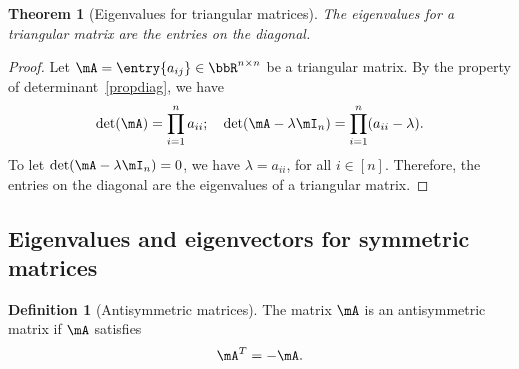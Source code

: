 \documentclass[11pt]{article}
\theoremstyle{plain}
\newtheorem{thm}{Theorem}[section]
\theoremstyle{definition}
\newtheorem{defn}{Definition}
\begin{document}
\begin{thm}[Eigenvalues for triangular matrices]\label{thm:trianeigen}
	The eigenvalues for a triangular matrix are the entries on the diagonal.
\end{thm}

\begin{proof}
Let $\mA = \entry{a_{ij}} \in \bbR^{n \times n}$ be a triangular matrix. By the property of determinant~\ref{propdiag}, we have
\[ \det(\mA) = \prod_{i=1}^n a_{ii}  ; \quad \det(\mA - \lambda \mI_n) = \prod_{i=1}^n (a_{ii}-\lambda). \]
To let $\det(\mA - \lambda \mI_n) = 0$, we have $\lambda = a_{ii}$, for all $ i\in[n]$. Therefore, the entries on the diagonal are the eigenvalues of a triangular matrix.
\end{proof}


\subsection{Eigenvalues and eigenvectors for symmetric matrices}

\begin{defn}[Antisymmetric matrices]
	The matrix $\mA$ is an antisymmetric matrix if $\mA$ satisfies
	\[\mA^T = - \mA. \] 
\end{defn}
\end{document}
